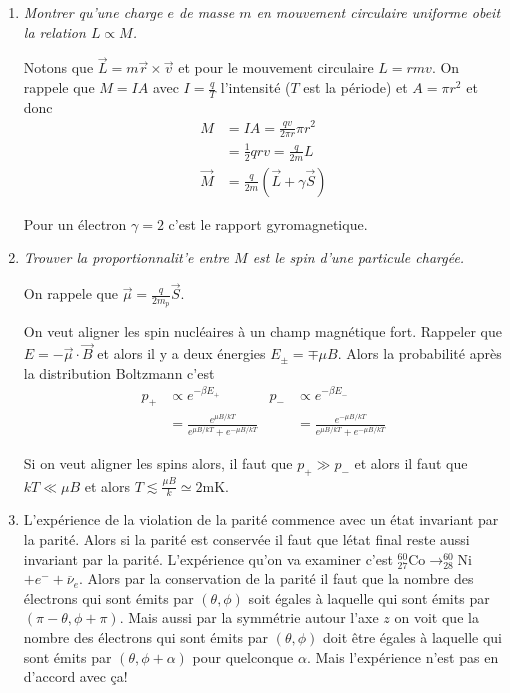 \documentclass[10pt]{report}
\begin{document}
\begin{enumerate}[1.]
    \item \emph{Montrer qu'une charge $e$ de masse $m$ en mouvement circulaire uniforme obeit la relation $L \propto M$.}

        Notons que $\vec{L} = m\vec{r} \times \vec{v}$ et pour le mouvement circulaire $L = rmv$. On rappele que $M = IA$ avec $I = \frac{q}{T}$ l'intensit\'e ($T$ est la p\'eriode) et $A = \pi r^2$ et donc
        \begin{align}
            M &= IA = \frac{qv}{2\pi r}\pi r^2\\
            &= \frac{1}{2}qrv = \frac{q}{2m}L\\
            \vec{M} &= \frac{q}{2m}\left( \vec{L} + \gamma\vec{S} \right)
        \end{align}

        Pour un \'electron $\gamma = 2$ c'est le rapport gyromagnetique.
    \item \emph{Trouver la proportionnalit'e entre $M$ est le spin d'une particule charg\'ee.}

        On rappele que $\vec{\mu} = \frac{q}{2m_p}\vec{S}$. 
        
        On veut aligner les spin nucl\'eaires \`a un champ magn\'etique fort. Rappeler que $E = -\vec{\mu} \cdot \vec{B}$ et alors il y a deux \'energies $E_{\pm} = \mp \mu B$. Alors la probabilit\'e apr\`es la distribution Boltzmann c'est
        \begin{align}
            p_+ &\propto e^{-\beta E_+} & p_- &\propto e^{-\beta E_-}\\
            &= \frac{e^{\mu B/kT}}{e^{\mu B/kT} + e^{-\mu B/kT}} & &= \frac{e^{-\mu B/kT}}{e^{\mu B/kT} + e^{-\mu B/kT}}
        \end{align}

        Si on veut aligner les spins alors, il faut que $p_+ \gg p_-$ et alors il faut que $kT \ll \mu B$ et alors $T \lesssim \frac{\mu B}{k} \simeq 2\mathrm{mK}$. 

    \item L'exp\'erience de la violation de la parit\'e commence avec un \'etat invariant par la parit\'e. Alors si la parit\'e est conserv\'ee il faut que l\'etat final reste aussi invariant par la parit\'e. L'exp\'erience qu'on va examiner c'est $^{60}_{27}$Co$\to ^{60}_{28}$Ni$ + e^{-} + \overline{\nu}_e$. Alors par la conservation de la parit\'e il faut que la nombre des \'electrons qui sont \'emits par $(\theta,\phi)$ soit \'egales \`a laquelle qui sont \'emits par $(\pi-\theta, \phi + \pi)$. Mais aussi par la symm\'etrie autour l'axe $z$ on voit que la nombre des \'electrons qui sont \'emits par $(\theta,\phi)$ doit \^etre \'egales \`a laquelle qui sont \'emits par $(\theta,\phi + \alpha)$ pour quelconque $\alpha$. Mais l'exp\'erience n'est pas en d'accord avec \c{c}a!
\end{enumerate}
\end{document}
